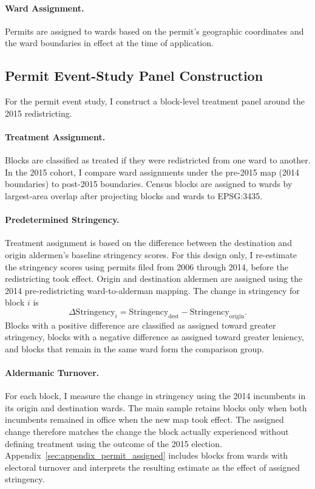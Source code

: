 \paragraph{Ward Assignment.}
Permits are assigned to wards based on the permit's geographic coordinates and the ward boundaries in effect at the time of application.

\subsection{Permit Event-Study Panel Construction}
\label{subsec:event_study_panel}

For the permit event study, I construct a block-level treatment panel around the 2015 redistricting.

\paragraph{Treatment Assignment.}
Blocks are classified as treated if they were redistricted from one ward to another.
In the 2015 cohort, I compare ward assignments under the pre-2015 map (2014 boundaries) to post-2015 boundaries.
Census blocks are assigned to wards by largest-area overlap after projecting blocks and wards to EPSG:3435.

\paragraph{Predetermined Stringency.}
Treatment assignment is based on the difference between the destination and origin aldermen's baseline stringency scores.
For this design only, I re-estimate the stringency scores using permits filed from 2006 through 2014, before the redistricting took effect.
Origin and destination aldermen are assigned using the 2014 pre-redistricting ward-to-alderman mapping.
The change in stringency for block $i$ is
\[
\Delta\text{Stringency}_i = \text{Stringency}_{\text{dest}} - \text{Stringency}_{\text{origin}}.
\]
Blocks with a positive difference are classified as assigned toward greater stringency, blocks with a negative difference as assigned toward greater leniency, and blocks that remain in the same ward form the comparison group.

\paragraph{Aldermanic Turnover.}
For each block, I measure the change in stringency using the 2014 incumbents in its origin and destination wards.
The main sample retains blocks only when both incumbents remained in office when the new map took effect.
The assigned change therefore matches the change the block actually experienced without defining treatment using the outcome of the 2015 election.
Appendix~\ref{sec:appendix_permit_assigned} includes blocks from wards with electoral turnover and interprets the resulting estimate as the effect of assigned stringency.

